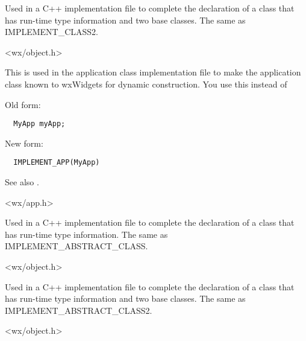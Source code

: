 
Used in a C++ implementation file to complete the declaration of
a class that has run-time type information and two base classes. The same as IMPLEMENT\_CLASS2.


<wx/object.h>


\label{implementapp}


This is used in the application class implementation file to make the application class known to
wxWidgets for dynamic construction. You use this instead of

Old form:

\begin{verbatim}
  MyApp myApp;
\end{verbatim}

New form:

\begin{verbatim}
  IMPLEMENT_APP(MyApp)
\end{verbatim}

See also .


<wx/app.h>


\label{implementclass}


Used in a C++ implementation file to complete the declaration of
a class that has run-time type information. The same as IMPLEMENT\_ABSTRACT\_CLASS.


<wx/object.h>


\label{implementclass2}


Used in a C++ implementation file to complete the declaration of a
class that has run-time type information and two base classes. The
same as IMPLEMENT\_ABSTRACT\_CLASS2.


<wx/object.h>


\label{implementdynamicclass}

